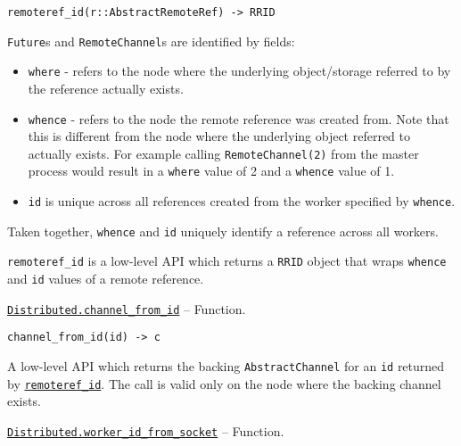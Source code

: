\begin{adjustwidth}{2em}{0pt}


\begin{verbatim}
remoteref_id(r::AbstractRemoteRef) -> RRID
\end{verbatim}

\texttt{Future}s and \texttt{RemoteChannel}s are identified by fields:

\begin{itemize}
\item \texttt{where} - refers to the node where the underlying object/storage referred to by the reference actually exists.


\item \texttt{whence} - refers to the node the remote reference was created from. Note that this is different from the node where the underlying object referred to actually exists. For example calling \texttt{RemoteChannel(2)} from the master process would result in a \texttt{where} value of 2 and a \texttt{whence} value of 1.


\item \texttt{id} is unique across all references created from the worker specified by \texttt{whence}.

\end{itemize}
Taken together,  \texttt{whence} and \texttt{id} uniquely identify a reference across all workers.

\texttt{remoteref\_id} is a low-level API which returns a \texttt{RRID} object that wraps \texttt{whence} and \texttt{id} values of a remote reference.



\end{adjustwidth}
\hypertarget{5007915834563819885}{}
\hyperlink{5007915834563819885}{\texttt{Distributed.channel\_from\_id}}  -- {Function.}

\begin{adjustwidth}{2em}{0pt}


\begin{verbatim}
channel_from_id(id) -> c
\end{verbatim}

A low-level API which returns the backing \texttt{AbstractChannel} for an \texttt{id} returned by \hyperlink{10046899291571146856}{\texttt{remoteref\_id}}. The call is valid only on the node where the backing channel exists.



\end{adjustwidth}
\hypertarget{806684110794204081}{}
\hyperlink{806684110794204081}{\texttt{Distributed.worker\_id\_from\_socket}}  -- {Function.}


